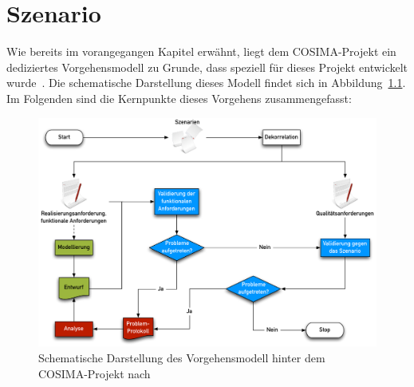 
\chapter{Szenario} %
\label{cha:szenario}

  Wie bereits im vorangegangen Kapitel erwähnt, liegt dem COSIMA-Projekt ein dediziertes Vorgehensmodell zu Grunde, dass speziell für dieses Projekt entwickelt wurde~\citep[S. 7]{bericht}. Die schematische Darstellung dieses Modell findet sich in Abbildung~\ref{fig:vorgehensmodell}. Im Folgenden sind die Kernpunkte dieses Vorgehens zusammengefasst:

  \begin{figure}[!ht]
    \centering
      \includegraphics[width=.9\textwidth]{images/Vorgehensmodell}
    \caption{Schematische Darstellung des Vorgehensmodell hinter dem COSIMA-Projekt nach~\citep{bericht}}
    \label{fig:vorgehensmodell}
  \end{figure}

